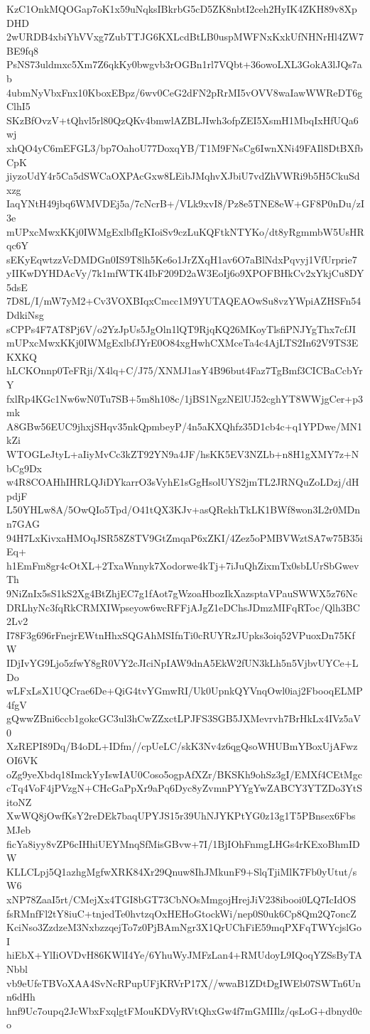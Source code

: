 KzC1OnkMQOGap7oK1x59uNqksIBkrbG5cD5ZK8nbtI2ceh2HyIK4ZKH89v8XpDHD
2wURDB4xbiYhVVxg7ZubTTJG6KXLcdBtLB0uspMWFNxKxkUfNHNrHl4ZW7BE9fq8
PsNS73uldmxc5Xm7Z6qkKy0bwgvb3rOGBn1rl7VQbt+36owoLXL3GokA3lJQs7ab
4ubmNyVbxFnx10KboxEBpz/6wv0CeG2dFN2pRrMI5vOVV8waIawWWReDT6gClhI5
SKzBfOvzV+tQhvl5rl80QzQKv4bmwlAZBLJIwh3ofpZEI5XsmH1MbqIxHfUQa6wj
xhQO4yC6mEFGL3/bp7OahoU77DoxqYB/T1M9FNsCg6IwnXNi49FAIl8DtBXfbCpK
jiyzoUdY4r5Ca5dSWCaOXPAcGxw8LEibJMqhvXJbiU7vdZhVWRi9b5H5CkuSdxzg
IaqYNtH49jbq6WMVDEj5a/7cNcrB+/VLk9xvI8/Pz8e5TNE8eW+GF8P0nDu/zI3e
mUPxcMwxKKj0IWMgExlbfIgKIoiSv9czLuKQFtkNTYKo/dt8yRgmmbW5UsHRqc6Y
sEKyEqwtzzVcDMDGn0IS9T8lh5Ke6o1JrZXqH1av6O7aBlNdxPqvyj1VfUrprie7
yIIKwDYHDAcVy/7k1mfWTK4IbF209D2aW3EoIj6o9XPOFBHkCv2xYkjCu8DY5dsE
7D8L/I/mW7yM2+Cv3VOXBIqxCmcc1M9YUTAQEAOwSu8vzYWpiAZHSFn54DdkiNsg
sCPPs4F7AT8Pj6V/o2YzJpUs5JgOln1lQT9RjqKQ26MKoyTlsfiPNJYgThx7cfJI
mUPxcMwxKKj0IWMgExlbfJYrE0O84xgHwhCXMceTa4c4AjLTS2In62V9TS3EKXKQ
hLCKOnnp0TeFRji/X4lq+C/J75/XNMJ1asY4B96but4Faz7TgBmf3CICBaCcbYrY
fxlRp4KGc1Nw6wN0Tu7SB+5m8h108c/1jBS1NgzNElUJ52cghYT8WWjgCer+p3mk
A8GBw56EUC9jhxjSHqv35nkQpmbeyP/4n5aKXQhfz35D1cb4c+q1YPDwe/MN1kZi
WTOGLeJtyL+aIiyMvCc3kZT92YN9a4JF/hsKK5EV3NZLb+n8H1gXMY7z+NbCg9Dx
w4R8COAHhIHRLQJiDYkarrO3sVyhE1sGgHsolUYS2jmTL2JRNQuZoLDzj/dHpdjF
L50YHLw8A/5OwQIo5Tpd/O41tQX3KJv+asQRekhTkLK1BWf8won3L2r0MDnn7GAG
94H7LxKivxaHMOqJSR58Z8TV9GtZmqaP6xZKI/4Zez5oPMBVWztSA7w75B35iEq+
h1EmFm8gr4cOtXL+2TxaWnnyk7Xodorwe4kTj+7iJuQhZixmTx0sbLUrSbGwevTh
9NiZnIx5sS1kS2Xg4BtZhjEC7g1fAot7gWzoaHbozIkXazsptaVPauSWWX5z76Nc
DRLhyNc3fqRkCRMXIWpseyow6wcRFFjAJgZ1eDChsJDmzMIFqRToc/Qlh3BC2Lv2
I78F3g696rFnejrEWtnHhxSQGAhMSIfnTi0cRUYRzJUpks3oiq52VPuoxDn75KfW
IDjIvYG9Ljo5zfwY8gR0VY2cJIciNpIAW9dnA5EkW2fUN3kLh5n5VjbvUYCe+LDo
wLFxLsX1UQCrae6De+QiG4tvYGmwRI/Uk0UpnkQYVnqOwl0iaj2FbooqELMP4fgV
gQwwZBni6ccb1gokcGC3ul3hCwZZxctLPJFS3SGB5JXMevrvh7BrHkLx4IVz5aV0
XzREPI89Dq/B4oDL+IDfm//cpUeLC/skK3Nv4z6qgQsoWHUBmYBoxUjAFwzOI6VK
oZg9yeXbdq18ImckYyIswIAU0Coso5ogpAfXZr/BKSKh9ohSz3gI/EMXf4CEtMgc
cTq4VoF4jPVzgN+CHcGaPpXr9aPq6Dyc8yZvmnPYYgYwZABCY3YTZDo3YtSitoNZ
XwWQ8jOwfKsY2reDEk7baqUPYJS15r39UhNJYKPtYG0z13g1T5PBnsex6FbsMJeb
ficYa8iyy8vZP6cIHhiUEYMnqSfMisGBvw+7I/1BjIOhFnmgLHGs4rKExoBhmIDW
KLLCLpj5Q1azhgMgfwXRK84Xr29Qnuw8IhJMkunF9+SlqTjiMlK7Fb0yUtut/sW6
xNP78ZaaI5rt/CMejXx4TGI8bGT73CbNOsMmgojHrejJiV238ibooi0LQ7IcIdOS
fsRMnfFl2tY8iuC+tnjedTe0hvtzqOxHEHoGtockWi/nep0S0uk6Cp8Qm2Q7oncZ
KciNso3ZzdzeM3NxbzzqejTo7z0PjBAmNgr3X1QrUChFiE59mqPXFqTWYcjslGoI
hiEbX+YlIiOVDvH86KWlI4Ye/6YhuWyJMFzLan4+RMUdoyL9IQoqYZSsByTANbbl
vb9eUfeTBVoXAA4SvNcRPupUFjKRVrP17X//wwaB1ZDtDgIWEb07SWTn6Unn6dHh
hnf9Uc7oupq2JcWbxFxqlgtFMouKDVyRVtQhxGw4f7mGMIIlz/qsLoG+dbnyd0co

